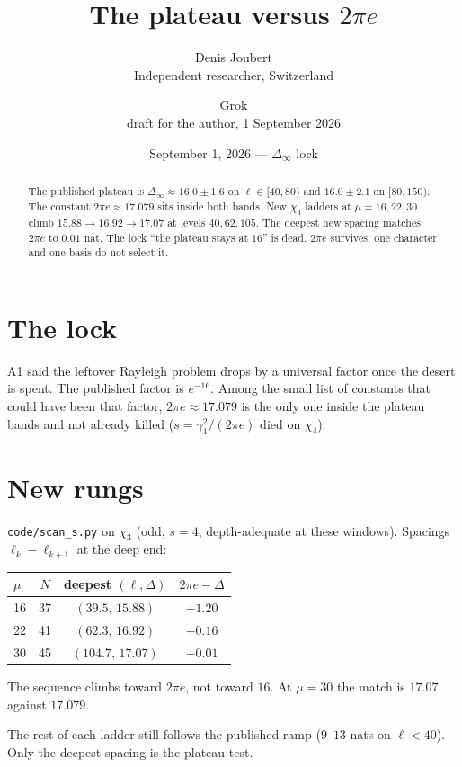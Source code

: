 \documentclass[10pt]{article}
\title{\bfseries The plateau versus $2\pi e$}
\author{Denis Joubert\\ \small Independent researcher, Switzerland
\and Grok\\ \small draft for the author, 1 September 2026}
\date{September 1, 2026 --- $\Delta_\infty$ lock}
\begin{document}
\maketitle
\begin{abstract}
\noindent
The published plateau is $\Delta_\infty\approx16.0\pm1.6$ on
$\ell\in[40,80)$ and $16.0\pm2.1$ on $[80,150)$. The constant
$2\pi e\approx17.079$ sits inside both bands. New $\chi_3$ ladders
at $\mu=16,22,30$ climb $15.88\to16.92\to17.07$ at levels
$40,62,105$. The deepest new spacing matches $2\pi e$ to $0.01$ nat.
The lock ``the plateau stays at $16$'' is dead. $2\pi e$ survives;
one character and one basis do not select it.
\end{abstract}

\section{The lock}

A1 said the leftover Rayleigh problem drops by a universal factor
once the desert is spent. The published factor is $e^{-16}$. Among
the small list of constants that could have been that factor,
$2\pi e\approx17.079$ is the only one inside the plateau bands
and not already killed ($s=\gamma_1^2/(2\pi e)$ died on $\chi_4$).

\section{New rungs}

\texttt{code/scan\_s.py} on $\chi_3$ (odd, $s=4$, depth-adequate
at these windows). Spacings $\ell_k-\ell_{k+1}$ at the deep end:

\begin{center}\small
\begin{tabular}{lccc}
\toprule
$\mu$ & $N$ & deepest $(\ell,\Delta)$ & $2\pi e-\Delta$ \\
\midrule
16 & 37 & $(39.5,\,15.88)$ & $+1.20$ \\
22 & 41 & $(62.3,\,16.92)$ & $+0.16$ \\
30 & 45 & $(104.7,\,17.07)$ & $+0.01$ \\
\bottomrule
\end{tabular}
\end{center}
The sequence climbs toward $2\pi e$, not toward $16$. At $\mu=30$
the match is $17.07$ against $17.079$.

The rest of each ladder still follows the published ramp
($9$--$13$ nats on $\ell<40$). Only the deepest spacing is the
plateau test.
\end{document}
